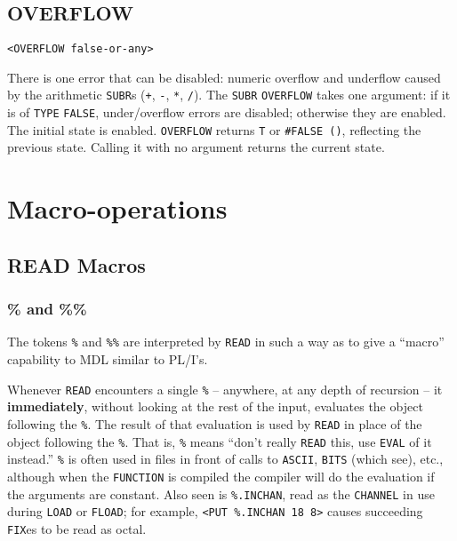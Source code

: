 \documentclass[a4paper]{scrbook}
\begin{document}
\section{OVERFLOW}\label{overflow}

\begin{verbatim}
<OVERFLOW false-or-any>
\end{verbatim}

 There is one error that can be disabled: numeric overflow and underflow caused by the
arithmetic \texttt{SUBR}s (\texttt{+}\index{\texttt{+}}, \texttt{-}\index{\texttt{-}}, \texttt{*}, \index{\texttt{*}}
\texttt{/}\index{\texttt{/}}). The \texttt{SUBR} \texttt{OVERFLOW} takes one argument: if it is of \texttt{TYPE}
\texttt{FALSE}, under/overflow errors are disabled; otherwise they are enabled. The initial state is enabled.
\texttt{OVERFLOW} returns \texttt{T} or \texttt{\#FALSE\ ()}, reflecting the previous state. Calling it with no argument
returns the current state.

\chapter{Macro-operations}\label{chapter-17.-macro-operations}

\section{READ Macros}\label{read-macros}

\subsection{\% and \%\%}\label{and}

The tokens \texttt{\%}  and \texttt{\%\%}  are interpreted by
\texttt{READ} in such a way as to give a ``macro'' capability to MDL similar to PL/I's.

Whenever \texttt{READ} encounters a single \texttt{\%} -- anywhere, at any depth of recursion -- it \textbf{immediately},
without looking at the rest of the input, evaluates the object following the \texttt{\%}. The result of that evaluation is
used by \texttt{READ} in place of the object following the \texttt{\%}. That is, \texttt{\%} means ``don't really
\texttt{READ} this, use \texttt{EVAL} of it instead.'' \texttt{\%} is often used in files in front of calls to
\texttt{ASCII}, \texttt{BITS} (which see), etc., although when the \texttt{FUNCTION} is compiled the compiler will do the
evaluation if the arguments are constant. Also seen is \texttt{\%.INCHAN}, read as the \texttt{CHANNEL} in use during
\texttt{LOAD} or \texttt{FLOAD}; for example, \texttt{\textless{}PUT\ \%.INCHAN\ 18\ 8\textgreater{}} causes succeeding
\texttt{FIX}es to be read as octal.
\end{document}
